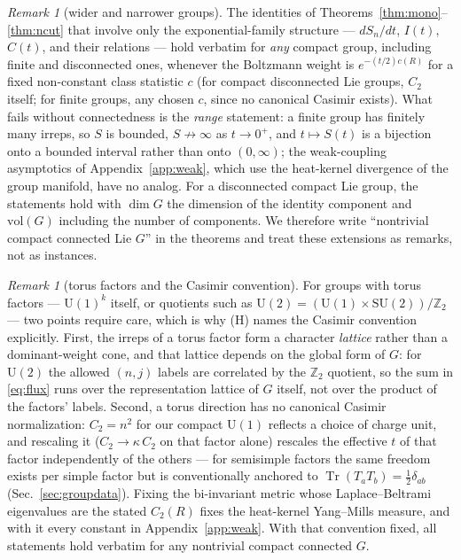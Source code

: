 \documentclass[11pt]{article}
\theoremstyle{remark}
\newtheorem{remark}[theorem]{Remark}
\theoremstyle{plain}
\newcommand{\dG}{\dim G}
\begin{document}
\begin{remark}[wider and narrower groups]\label{rem:groups}
The identities of Theorems~\ref{thm:mono}--\ref{thm:ncut} that involve only the exponential-family structure --- $dS_n/dt$, $I(t)$, $C(t)$, and their relations --- hold verbatim for \emph{any} compact group, including finite and disconnected ones, whenever the Boltzmann weight is $e^{-(t/2)c(R)}$ for a fixed non-constant class statistic $c$ (for compact disconnected Lie groups, $C_2$ itself; for finite groups, any chosen $c$, since no canonical Casimir exists). What fails without connectedness is the \emph{range} statement: a finite group has finitely many irreps, so $S$ is bounded, $S \not\to \infty$ as $t \to 0^+$, and $t \mapsto S(t)$ is a bijection onto a bounded interval rather than onto $(0,\infty)$; the weak-coupling asymptotics of Appendix~\ref{app:weak}, which use the heat-kernel divergence of the group manifold, have no analog. For a disconnected compact Lie group, the statements hold with $\dG$ the dimension of the identity component and $\mathrm{vol}(G)$ including the number of components. We therefore write ``nontrivial compact connected Lie $G$'' in the theorems and treat these extensions as remarks, not as instances.
\end{remark}

\begin{remark}[torus factors and the Casimir convention]\label{rem:torus}
For groups with torus factors --- $\mathrm{U}(1)^k$ itself, or quotients such as $\mathrm{U}(2) = (\mathrm{U}(1)\times\mathrm{SU}(2))/\mathbb{Z}_2$ --- two points require care, which is why (H) names the Casimir convention explicitly. First, the irreps of a torus factor form a character \emph{lattice} rather than a dominant-weight cone, and that lattice depends on the global form of $G$: for $\mathrm{U}(2)$ the allowed $(n, j)$ labels are correlated by the $\mathbb{Z}_2$ quotient, so the sum in \eqref{eq:flux} runs over the representation lattice of $G$ itself, not over the product of the factors' labels. Second, a torus direction has no canonical Casimir normalization: $C_2 = n^2$ for our compact $\mathrm{U}(1)$ reflects a choice of charge unit, and rescaling it ($C_2 \to \kappa\, C_2$ on that factor alone) rescales the effective $t$ of that factor independently of the others --- for semisimple factors the same freedom exists per simple factor but is conventionally anchored to $\operatorname{Tr}(T_a T_b) = \tfrac12\delta_{ab}$ (Sec.~\ref{sec:groupdata}). Fixing the bi-invariant metric whose Laplace--Beltrami eigenvalues are the stated $C_2(R)$ fixes the heat-kernel Yang--Mills measure, and with it every constant in Appendix~\ref{app:weak}. With that convention fixed, all statements hold verbatim for any nontrivial compact connected $G$.
\end{remark}
\end{document}
